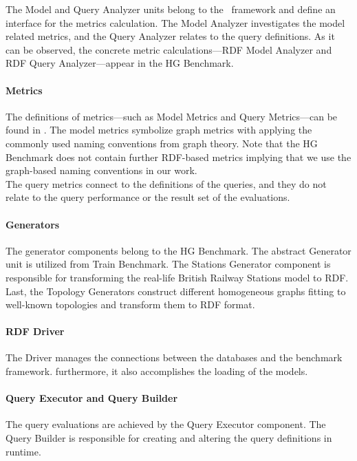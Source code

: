 The \textsf{Model} and \textsf{Query Analyzer} units belong to the \framework~framework and define an interface for the metrics calculation. The \textsf{Model Analyzer} investigates the model related metrics, and the \textsf{Query Analyzer} relates to the query definitions. As it can be observed, the concrete metric calculations---\textsf{RDF Model Analyzer} and \textsf{RDF Query Analyzer}---appear in the HG Benchmark.

\paragraph{Metrics}

The definitions of metrics---such as \textsf{Model Metrics}  and \textsf{Query Metrics}---can be found in \framework. The model metrics symbolize graph metrics with applying the commonly used naming conventions from graph theory. Note that the HG Benchmark does not contain further RDF-based metrics implying that we use the graph-based naming conventions in our work.\\
The query metrics connect to the definitions of the queries, and they do not relate to the query performance or the result set of the evaluations.

\paragraph{Generators}

The generator components belong to the HG Benchmark. The abstract \textsf{Generator} unit is utilized from Train Benchmark. The \textsf{Stations Generator} component is responsible for transforming the real-life British Railway Stations model to RDF. Last, the \textsf{Topology Generators} construct different homogeneous graphs fitting to well-known topologies and transform them to RDF format.

\paragraph{RDF Driver}
The \textsf{Driver} manages the connections between the databases and the benchmark framework. furthermore, it also accomplishes the loading of the models. 

\paragraph{Query Executor and Query Builder}

The query evaluations are achieved by the \textsf{Query Executor} component. The \textsf{Query Builder} is responsible for creating and altering the query definitions in runtime.


